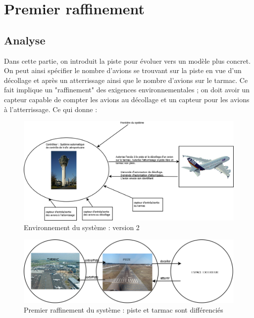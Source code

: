 \section{Premier raffinement}

\subsection{Analyse}
Dans cette partie, on introduit la piste pour évoluer vers un modèle plus concret. On peut ainsi spécifier le nombre d'avions se trouvant sur la piste en vue  d'un décollage et après un atterrissage ainsi que le nombre d'avions sur le tarmac.
Ce fait implique un "raffinement" des exigences environnementales ; on doit avoir un capteur capable de compter les avions au décollage et un capteur pour les avions à l'atterrissage. Ce qui donne :
\begin{figure}[H]
	\begin{center}	
		\includegraphics[scale=0.3]{images/1/env2}
		\caption{Environnement du système : version 2}
		\label{ctx}
	\end{center}
\end{figure}
\begin{figure}[H]
	\begin{center}	
		\includegraphics[scale=0.4]{images/1/raf1}
		\caption{Premier raffinement du système : piste et tarmac sont différenciés}
		\label{raf1}
	\end{center}
\end{figure}

